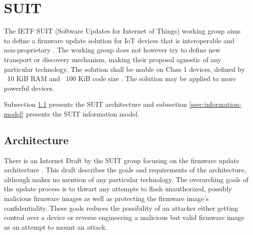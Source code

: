 \documentclass[0-thesis.tex]{subfiles}
\begin{document}
\section{SUIT}
\label{sec:suit}
The IETF SUIT (Software Updates for Internet of Things) working group aims to define a
firmware update solution for IoT devices that is interoperable and non-proprietary
\parencite{suit}. The working group does not however try to define new transport or
discovery mechanism, making their proposal agnostic of any particular technology. The
solution shall be usable on Class 1 devices, defined by ~10 KiB RAM and ~100 KiB code size
\parencite{rfc7228}. The solution may be applied to more powerful devices. 

Subsection \ref{ssec:architecture} presents the SUIT architecture and subsection
\ref{ssec:information-model} presents the SUIT information model.

\subsection{Architecture}
\label{ssec:architecture}
There is an Internet Draft by the SUIT group focusing on the firmware update architecture
\parencite{suit-architecture}. This draft describes the goals and requirements of the
architecture, although makes no mention of any particular technology. The overarching
goals of the update process is to thwart any attempts to flash unauthorized, possibly
malicious firmware images as well as protecting the firmware image's confidentiality.
These goals reduces the possibility of an attacker either getting control over a device or
reverse engineering a malicious but valid firmware image as an attempt to mount an attack.
\end{document}
